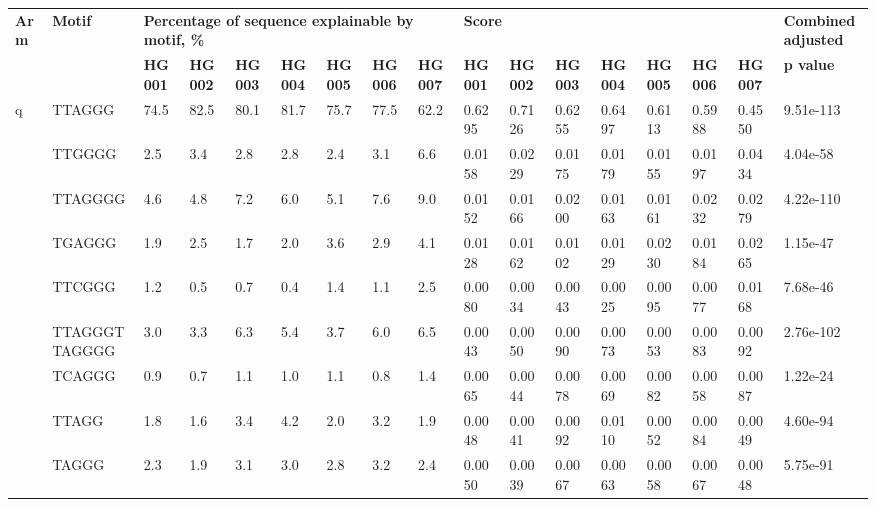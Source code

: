 \begin{landscape} \begin{samepage} \begin{table}[h!] \scriptsize \begin{tabular}{lllllllllllllllll}
\hline
\textbf{Arm} & \textbf{Motif} & \multicolumn{7}{l}{\textbf{Percentage of sequence explainable by motif, \%}} & \multicolumn{7}{l}{\textbf{Score}} & \textbf{Combined adjusted} \\
\textbf{}    & \textbf{}      & \textbf{HG001} & \textbf{HG002} & \textbf{HG003} & \textbf{HG004} & \textbf{HG005} & \textbf{HG006} & \textbf{HG007} &   \textbf{HG001} &   \textbf{HG002} &   \textbf{HG003} &   \textbf{HG004} &   \textbf{HG005} &   \textbf{HG006} &   \textbf{HG007} &  \textbf{p value} \\
\hline
q            &         TTAGGG & 74.5  & 82.5  & 80.1  & 81.7  & 75.7  & 77.5  & 62.2  &  0.6295 &  0.7126 &  0.6255 &  0.6497 &  0.6113 &  0.5988 &  0.4550 &  9.51e-113 \\
\textbf{}    &         TTGGGG &  2.5  &  3.4  &  2.8  &  2.8  &  2.4  &  3.1  &  6.6  &  0.0158 &  0.0229 &  0.0175 &  0.0179 &  0.0155 &  0.0197 &  0.0434 &   4.04e-58 \\
\textbf{}    &        TTAGGGG &  4.6  &  4.8  &  7.2  &  6.0  &  5.1  &  7.6  &  9.0  &  0.0152 &  0.0166 &  0.0200 &  0.0163 &  0.0161 &  0.0232 &  0.0279 &  4.22e-110 \\
\textbf{}    &         TGAGGG &  1.9  &  2.5  &  1.7  &  2.0  &  3.6  &  2.9  &  4.1  &  0.0128 &  0.0162 &  0.0102 &  0.0129 &  0.0230 &  0.0184 &  0.0265 &   1.15e-47 \\
\textbf{}    &         TTCGGG &  1.2  &  0.5  &  0.7  &  0.4  &  1.4  &  1.1  &  2.5  &  0.0080 &  0.0034 &  0.0043 &  0.0025 &  0.0095 &  0.0077 &  0.0168 &   7.68e-46 \\
\textbf{}    &  TTAGGGTTAGGGG &  3.0  &  3.3  &  6.3  &  5.4  &  3.7  &  6.0  &  6.5  &  0.0043 &  0.0050 &  0.0090 &  0.0073 &  0.0053 &  0.0083 &  0.0092 &  2.76e-102 \\
\textbf{}    &         TCAGGG &  0.9  &  0.7  &  1.1  &  1.0  &  1.1  &  0.8  &  1.4  &  0.0065 &  0.0044 &  0.0078 &  0.0069 &  0.0082 &  0.0058 &  0.0087 &   1.22e-24 \\
\textbf{}    &          TTAGG &  1.8  &  1.6  &  3.4  &  4.2  &  2.0  &  3.2  &  1.9  &  0.0048 &  0.0041 &  0.0092 &  0.0110 &  0.0052 &  0.0084 &  0.0049 &   4.60e-94 \\
\textbf{}    &          TAGGG &  2.3  &  1.9  &  3.1  &  3.0  &  2.8  &  3.2  &  2.4  &  0.0050 &  0.0039 &  0.0067 &  0.0063 &  0.0058 &  0.0067 &  0.0048 &   5.75e-91 \\

\end{tabular}
\end{table}
\end{samepage}
\end{landscape}
